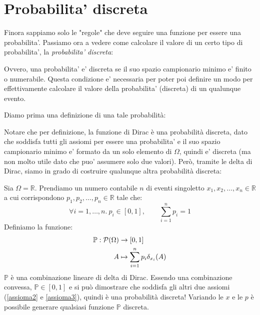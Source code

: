 \section{Probabilita' discreta}
Finora sappiamo solo le "regole" che deve seguire una funzione per essere una probabilita'. Passiamo ora a vedere come calcolare il valore di un certo tipo di probabilita', la \textit{probabilita' discreta}:

Ovvero, una probabilita' e' discreta se il suo spazio campionario minimo e' finito o numerabile. Questa condizione e' necessaria per poter poi definire un modo per effettivamente calcolare il valore della probabilita' (discreta) di un qualunque evento.

Diamo prima una definizione di una tale probabilità:

Notare che per definizione, la funzione di Dirac è una probabilità discreta, dato che soddisfa tutti gli assiomi per essere una probabilita' e il suo spazio campionario minimo e' formato da un solo elemento di $ \Omega $, quindi e' discreta (ma non molto utile dato che puo' assumere solo due valori). Però, tramite le delta di Dirac, siamo in grado di costruire qualunque altra probabilità discreta:

Sia \( \Omega = \mathbb{R} \). Prendiamo un numero contabile \( n \) di eventi singoletto \( x_1,x_2,\ldots,x_n \in \mathbb{R} \) a cui corrispondono \( p_1,p_2,\ldots,p_n \in \mathbb{R} \) tale che:
\[
 \forall i = 1,\ldots,n.\ p_i \in [0,1], \qquad  \sum_{i=1}^{n} p_i = 1 
\]
Definiamo la funzione:
\[
\begin{aligned}
  \mathbb{P}: \mathcal{P}(\Omega) &\to [0,1]\\
  A &\mapsto \sum_{i=1}^{n} p_i \delta_{x_i}(A)
\end{aligned}
\]
\( \mathbb{P} \) è una combinazione lineare di delta di Dirac. Essendo una combinazione convessa, \( \mathbb{P} \in [0,1] \) e si può dimostrare che soddisfa gli altri due assiomi (\ref{assioma2} e \ref{assioma3}), quindi è una probabilità discreta! Variando le \( x \) e le \( p \) è possibile generare qualsiasi funzione \( \mathbb{P} \) discreta.

